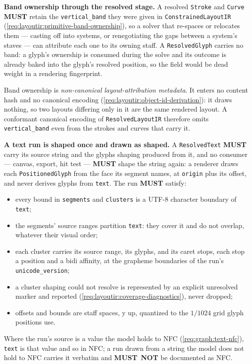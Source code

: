 \documentclass[11pt,letterpaper]{report}
\newcounter{requirement}[chapter]
\newcommand{\MUST}{\textbf{MUST}}
\newcommand{\MUSTNOT}{\textbf{MUST}\nobreak\ \textbf{NOT}}
\begin{document}
\begin{requirement}
  \label{req:layoutir:resolved-band-ownership}
  \textbf{Band ownership through the resolved stage.} A resolved
  \texttt{Stroke} and \texttt{Curve} \MUST{} retain the
  \texttt{vertical\_band} they were given in
  \texttt{ConstrainedLayoutIR}
  (\ref{req:layoutir:primitive-band-ownership}), so a solver that
  re-spaces or relocates them --- casting off into systems, or
  renegotiating the gaps between a system's staves --- can attribute
  each one to its owning staff. A \texttt{ResolvedGlyph} carries no
  band: a glyph's ownership is consumed during the solve and its
  outcome is already baked into the glyph's resolved position, so the
  field would be dead weight in a rendering fingerprint.

  Band ownership is \emph{non-canonical layout-attribution metadata}.
  It enters no content hash and no canonical encoding
  (\ref{req:layoutir:object-id-derivation}): it draws nothing, so two
  layouts differing only in it are the same rendered layout. A
  conformant canonical encoding of \texttt{ResolvedLayoutIR} therefore
  omits \texttt{vertical\_band} even from the strokes and curves that
  carry it.
\end{requirement}

\begin{requirement}
  \label{req:layoutir:text-run}
  \textbf{A text run is shaped once and drawn as shaped.} A
  \texttt{ResolvedText} \MUST{} carry its source string and the glyphs
  shaping produced from it, and no consumer --- canvas, export, hit
  test --- \MUST{} shape the string again: a renderer draws each
  \texttt{PositionedGlyph} from the face its segment names, at
  \texttt{origin} plus its offset, and never derives glyphs from
  \texttt{text}. The run \MUST{} satisfy:
  \begin{itemize}
    \item every bound in \texttt{segments} and \texttt{clusters} is a
      UTF-8 character boundary of \texttt{text};
    \item the segments' source ranges partition \texttt{text}: they cover
      it and do not overlap, whatever their visual order;
    \item each cluster carries its source range, its glyphs, and its caret
      stops, each stop a position and a bidi affinity, at the grapheme
      boundaries of the run's \texttt{unicode\_version};
    \item a cluster shaping could not resolve is represented by an
      explicit unresolved marker and reported
      (\ref{req:layoutir:coverage-diagnostics}), never dropped;
    \item offsets and bounds are staff spaces, y up, quantized to the
      $1/1024$ grid glyph positions use.
  \end{itemize}
  Where the run's source is a value the model holds to NFC
  (\ref{req:graph:text-nfc}), \texttt{text} is that value and so in NFC;
  a run drawn from a string the model does not hold to NFC carries it
  verbatim and \MUSTNOT{} be documented as NFC.
\end{requirement}
\end{document}
